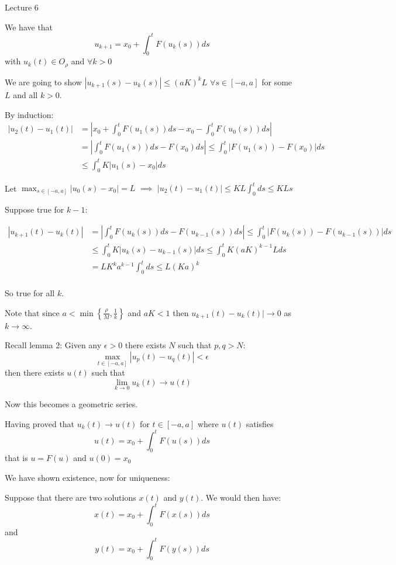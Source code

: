 \begin{center}

Lecture 6

\end{center}

We have that $$u_{k+1} = x_0 + \int_0^t F(u_k(s)) ds$$ with $u_k(t) \in O_{\rho}$ and $\forall k > 0$

We are going to show $|u_{k+1} (s) - u_k(s)| \leq (aK)^{k} L$ $\forall s \in [-a,a]$ for some $L$ and all $k>0$.

By induction: 
\begin{align*}
|u_2(t) - u_1(t)| &= |x_0 + \int_0^t F(u_1(s)) ds - x_0 - \int_0^t F(u_0(s)) ds| \\
&= |\int_0^t F(u_1(s)) ds - F(x_0) ds| \leq \int_0^t |F(u_1(s)) - F(x_0)| ds \\
&\leq \int_0^t K|u_1(s) - x_0| ds
\end{align*}

Let $\max_{s\in[-a,a]} |u_0(s) - x_0| = L$ $\implies$ $|u_2(t) - u_1(t)| \leq KL \int_0^t ds \leq KLs$

Suppose true for $k-1$:

\begin{align*}
|u_{k+1}(t) - u_k(t)| &= | \int_0^t F(u_k(s)) ds - F(u_{k-1}(s)) ds | \leq \int_0^t |F(u_k(s)) - F(u_{k-1}(s))| ds \\
&\leq \int_0^t K |u_k(s) - u_{k-1}(s)| ds \leq \int_0^t K(aK)^{k-1} L ds \\
&= LK^k a^{k-1} \int_0^t ds \leq L(Ka)^{k} \\
\end{align*}

So true for all $k$.

Note that since $a < \min \left\{\frac{\rho}{M}, \frac{1}{k}\right\}$ and $aK<1$ then $u_{k+1} (t) - u_k(t) | \rightarrow 0$ as $k \rightarrow \infty$.

Recall lemma 2: Given any $\epsilon > 0$ there exists $N$ such that $p,q>N$: $$\max_{t\in [-a,a]} |u_p(t) - u_q(t)| < \epsilon$$ then there exists $u(t)$ such that $$\lim_{k \rightarrow 0} u_k(t) \rightarrow u(t)$$

Now this becomes a geometric series.

Having proved that $u_k(t) \rightarrow u(t)$ for $t \in [-a,a]$ where $u(t)$ satisfies $$u(t) = x_0 + \int_0^t F(u(s)) ds$$ that is $u=F(u)$ and $u(0) = x_0$

We have shown existence, now for uniqueness:

Suppose that there are two solutions $x(t)$ and $y(t)$. We would then have: $$x(t) = x_0 + \int_0^t F(x(s)) ds$$ and $$y(t) = x_0 + \int_0^t F(y(s)) ds$$

